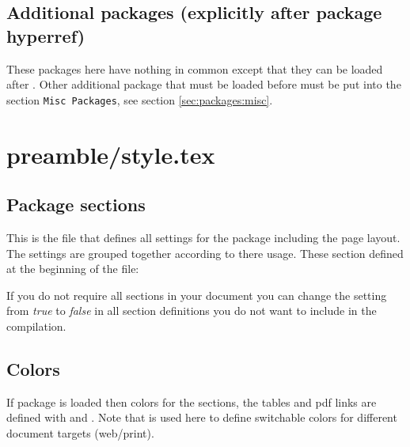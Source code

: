 
\subsection{Additional packages  (explicitly after package hyperref)}

These packages here have nothing in common except that they can be loaded after . Other additional package that must be loaded before must be put into the section \texttt{Misc Packages}, see section \cref{sec:packages:misc}.


\section{preamble/style.tex}

\subsection{Package sections}

This is the file that defines all settings for the package including the page layout. The settings are grouped together according to there usage. 
These section defined at the beginning of the file:


If you do not require all sections in your document you can change the setting from \emph{true} to \emph{false} in all section definitions you do not want to include in the compilation.

\subsection{Colors}

If package  is loaded then colors for the sections, the tables and pdf links are defined with  and . Note that  is used here to define switchable colors for different document targets (web/print).


